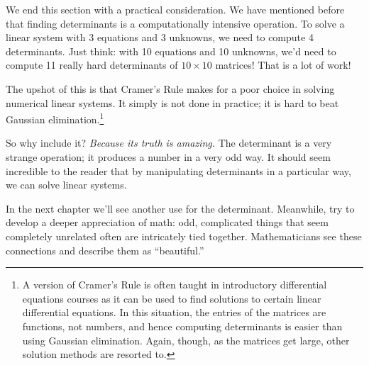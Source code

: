 %
%
%
%
%

We end this section with a practical consideration. We have mentioned before that finding determinants is a computationally intensive operation. To solve a linear system with 3 equations and 3 unknowns, we need to compute 4 determinants. Just think: with 10 equations and 10 unknowns, we'd need to compute 11 really hard determinants of $10\times 10$ matrices! That is a lot of work!

The upshot of this is that Cramer's Rule makes for a poor choice in solving numerical linear systems. It simply is not done in practice; it is hard to beat Gaussian elimination.\footnote{A version of Cramer's Rule is often taught in introductory differential equations courses as it can be used to find solutions to certain linear differential equations. In this situation, the entries of the matrices are functions, not numbers, and hence computing determinants is easier than using Gaussian elimination. Again, though, as the matrices get large, other solution methods are resorted to.}

So why include it? \textit{Because its truth is amazing.} The determinant is a very strange operation; it produces a number in a very odd way. It should seem incredible to the reader that by manipulating determinants in a particular way, we can solve linear systems.


In the next chapter we'll see another use for the determinant. Meanwhile, try to develop a deeper appreciation of math: odd, complicated things that seem completely unrelated often are intricately tied together. Mathematicians see these connections and describe them as ``beautiful.''


